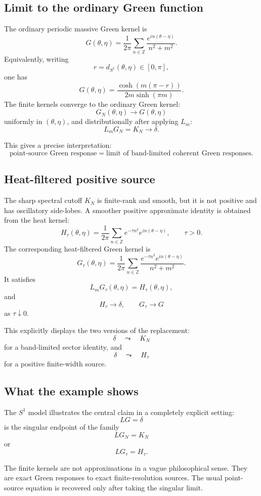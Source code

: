 \documentclass[11pt]{article}
\begin{document}
\subsection{Limit to the ordinary Green function}

The ordinary periodic massive Green kernel is
\[
G(\theta,\eta)
=
\frac{1}{2\pi}\sum_{n\in\mathbb Z}
\frac{e^{in(\theta-\eta)}}{n^2+m^2}.
\]
Equivalently, writing
\[
r=d_{S^1}(\theta,\eta)\in[0,\pi],
\]
one has
\[
G(\theta,\eta)
=
\frac{\cosh(m(\pi-r))}{2m\sinh(\pi m)}.
\]
The finite kernels converge to the ordinary Green kernel:
\[
G_N(\theta,\eta)\to G(\theta,\eta)
\]
uniformly in \((\theta,\eta)\), and distributionally after applying \(L_m\):
\[
L_mG_N=K_N\to\delta.
\]

This gives a precise interpretation:
\[
\boxed{
\text{point-source Green response}
=
\text{limit of band-limited coherent Green responses}.
}
\]

\subsection{Heat-filtered positive source}

The sharp spectral cutoff \(K_N\) is finite-rank and smooth, but it is not positive and has oscillatory side-lobes. A smoother positive approximate identity is obtained from the heat kernel:
\[
H_\tau(\theta,\eta)
=
\frac{1}{2\pi}\sum_{n\in\mathbb Z}e^{-\tau n^2}e^{in(\theta-\eta)},
\qquad \tau>0.
\]
The corresponding heat-filtered Green kernel is
\[
G_\tau(\theta,\eta)
=
\frac{1}{2\pi}\sum_{n\in\mathbb Z}
\frac{e^{-\tau n^2}e^{in(\theta-\eta)}}{n^2+m^2}.
\]
It satisfies
\[
L_mG_\tau(\theta,\eta)=H_\tau(\theta,\eta),
\]
and
\[
H_\tau\to\delta,
\qquad
G_\tau\to G
\]
as \(\tau\downarrow0\).

This explicitly displays the two versions of the replacement:
\[
\delta
\quad\leadsto\quad
K_N
\]
for a band-limited sector identity, and
\[
\delta
\quad\leadsto\quad
H_\tau
\]
for a positive finite-width source.

\subsection{What the example shows}

The \(S^1\) model illustrates the central claim in a completely explicit setting:
\[
LG=\delta
\]
is the singular endpoint of the family
\[
LG_N=K_N
\]
or
\[
LG_\tau=H_\tau.
\]

The finite kernels are not approximations in a vague philosophical sense. They are exact Green responses to exact finite-resolution sources. The usual point-source equation is recovered only after taking the singular limit.
\end{document}
